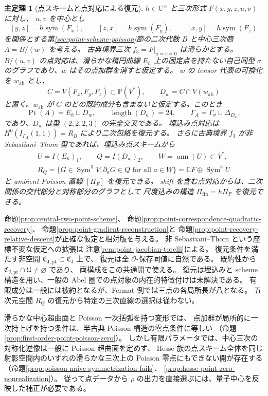 \documentclass[11pt,a4paper]{ltjsarticle}
\numberwithin{equation}{section}
\newtheorem{maintheorem}{主定理}
\newcommand{\C}{\mathbb C}
\newcommand{\PP}{\mathbb P}
\newcommand{\Sym}{\operatorname{Sym}}
\newcommand{\Symm}{\operatorname{sym}}
\begin{document}
\begin{maintheorem}[点スキームと点対応による復元]\label{thm:intro-points}
$h\in\C^\times$ と三次形式 $F(x,y,z,u,v)$ に対し、
$u,v$ を中心とし
\[
 [y,z]=h\Symm(F_x),\qquad [z,x]=h\Symm(F_y),\qquad [x,y]=h\Symm(F_z)
\]
を関係とする第\ref{sec:point-scheme-poisson}節の二次代数 $B$ と中心三次商 $A=B/(w)$ を考える。
古典境界三次 $f_3=F|_{u=v=0}$ は滑らかとする。
$B/(u,v)$ の点対応は、滑らかな楕円曲線 $E_h$ 上の固定点を持たない自己同型
$\sigma$ のグラフであり、$w$ はその点加群を消すと仮定する。
$w$ の tensor 代表の可換化を $w_{\mathrm{ab}}$ とし、
\[
 C=V(F_x,F_y,F_z)\subset\PP(V^*),\qquad
 D_w=C\cap V(w_{\mathrm{ab}})
\]
と置く。$w_{\mathrm{ab}}$ が $C$ のどの既約成分も含まないと仮定する。このとき
\[
 \operatorname{Pt}(A)=E_h\sqcup D_w,\qquad \operatorname{length}(D_w)=24,
 \qquad \Gamma_A=\Gamma_\sigma\sqcup\Delta_{D_w},
\]
であり、$D_w$ は型 $(2,2,2,3)$ の完全交叉である。
埋込み点対応は $H^0(I_{\Gamma_A}(1,1))=R_B$ により二次包絡を復元する。
さらに古典境界 $f_3$ が非 Sebastiani--Thom 型であれば、埋込み点スキームから
\[
 \begin{gathered}
 U=I(E_h)_1,\qquad Q=I(D_w)_2,\qquad W=\operatorname{ann}(U)\subset V^*,\\
 R_Q=\{G\in\Sym^3V:\partial_aG\in Q\text{ for all }a\in W\}
        =\C F\oplus\Sym^3U
 \end{gathered}
\]
と ambient Poisson 直線 $[\Pi_F]$ を復元できる。
shift を含む点対応からは、二次関係の交代部分と対称部分のグラフとして
尺度込みの構造 $\Pi_{\mathrm{fin}}=h\Pi_F$ を復元できる。
\end{maintheorem}

命題\ref{prop:central-two-point-scheme}、
命題\ref{prop:point-correspondence-quadratic-recovery}、
命題\ref{prop:point-gradient-reconstruction}と
命題\ref{prop:point-recovery-relative-descent}が正確な仮定と相対版を与える。
非 Sebastiani--Thom という座標不変な仮定への拡張は
注意\ref{rem:point-jacobian-torelli}による。
復元条件を満たす非空開 $\mathfrak C_{\mathrm{J,pt}}\subset\mathfrak C_{\mathrm J}$ 上で、
復元は全 $\mathcal O$-保存同値に自然である。
既約性から $\mathfrak C_{\mathrm{J,pt}}\cap\mathfrak U\ne\varnothing$ であり、
両構成をこの共通開で使える。
復元は埋込みと scheme 構造を用い、一般の Abel 圏での点対象の内在的特徴付けは未解決である。
有限成分は一般には被約となるが、Fermat 例では三点の各局所長が八となる。
五次元空間 $R_Q$ の復元から特定の三次直線の選択は従わない。

滑らかな中心超曲面と Poisson 一次括弧を持つ変形では、
点加群が局所的に一次持上げを持つ条件は、半古典 Poisson 構造の零点条件に等しい
（命題\ref{prop:first-order-point-poisson-zero}）。
しかし有限パラメータでは、中心三次の対称化逆像は一般に Poisson 超曲面を定めず、
Hesse 族の点スキーム全体を同じ射影空間内のいずれの滑らかな三次上の
Poisson 零点にもできない開が存在する
（命題\ref{prop:poisson-naive-symmetrization-fails}、
\ref{prop:hesse-point-zero-nonrealization}）。
従って点データから $\rho$ の出力を直接選ぶには、量子中心を反映した補正が必要である。
\end{document}

